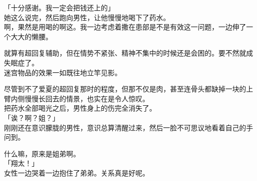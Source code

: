 「十分感谢。我一定会把钱还上的」\\

她这么说完，然后跑向男性，让他慢慢地喝下了药水。\\

啊，果然是用喝的啊这。我一边考虑着撒在患部是不是有效这一问题，一边伸了一个大大的懒腰。

就算有超回复辅助，但在情势不紧张、精神不集中的时候还是会困的。要不然就成失眠症了。\\

迷宫物品的效果一如既往地立竿见影。

尽管到不了爱夏的超回复那时的程度，但那不仅是肉，甚至连骨头都缺掉一块的上臂内侧慢慢长回去的情景，也实在是令人惊叹。\\

把药水全部喝光之后，男性身上的伤完全消失了。\\

「诶？啊？姐？」\\

刚刚还在意识朦胧的男性，意识总算清醒过来，然后一脸不可思议地看着自己的手问到。

什么嘛，原来是姐弟啊。\\

「翔太！」\\

女性一边哭着一边抱住了弟弟。关系真是好呢。\\

